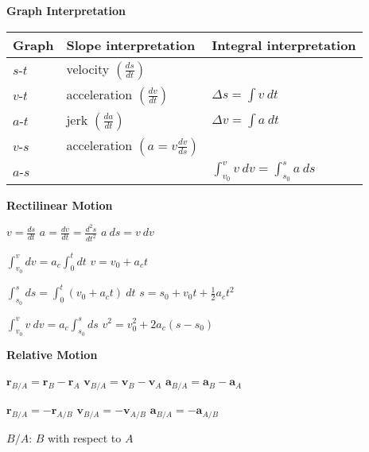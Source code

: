 \documentclass[twocolumn]{article}
\def\arraystretch{1.15}
\begin{document}
\textbf{Graph Interpretation}
\vspace{-.5em}
\begin{table}[h]
    \def\arraystretch{2}
    \begin{tabular}{lll}
        \toprule
        Graph & Slope interpretation & Integral interpretation \\
        \midrule
        $s$-$t$ & velocity $\left( \frac{ds}{dt} \right)$ \\
        $v$-$t$ & acceleration $\left( \frac{dv}{dt} \right)$ & $\Delta s = \displaystyle\int v\ dt$ \\
        $a$-$t$ & jerk $\left( \frac{da}{dt} \right)$ & $\Delta v = \displaystyle\int a\ dt$ \\
        \midrule
        $v$-$s$ & acceleration $\left(a = v \frac{dv}{ds}\right)$ \\
        $a$-$s$ & & $\int_{v_0}^v v\ dv = \displaystyle\int_{s_0}^s a\ ds$ \\
        \bottomrule
    \end{tabular}
\end{table} \vspace{-1em}

\vspace{-.5em}
\dotfill

\textbf{Rectilinear Motion}

$v = \frac{ds}{dt}$ \hfill $a = \frac{dv}{dt} = \frac{d^2s}{dt^2}$ \hfill $a\ ds = v\ dv$

$\displaystyle\int_{v_0}^v dv = a_c \displaystyle\int_0^t dt$ \hfill $v = v_0 + a_c t$

$\displaystyle\int_{s_0}^s ds = \displaystyle\int_0^t (v_0 + a_c t)\ dt$ \hfill $s = s_0 + v_0 t + \frac{1}{2} a_c t^2$

$\displaystyle\int_{v_0}^v v\ dv = a_c \displaystyle\int_{s_0}^s ds$ \hfill $v^2 = v_0^2  + 2a_c (s-s_0)$

\dotfill

\textbf{Relative Motion}

$\mathbf{r}_{B/A} = \mathbf{r}_B - \mathbf{r}_A$ \hfill $\mathbf{v}_{B/A} = \mathbf{v}_B - \mathbf{v}_A$ \hfill $\mathbf{a}_{B/A} = \mathbf{a}_B - \mathbf{a}_A$

$\mathbf{r}_{B/A} = -\mathbf{r}_{A/B}$ \hfill $\mathbf{v}_{B/A} = -\mathbf{v}_{A/B}$ \hfill $\mathbf{a}_{B/A} = -\mathbf{a}_{A/B}$

$B/A$: $B$ with respect to $A$

\vspace{-.5em}
\dotfill
\end{document}

